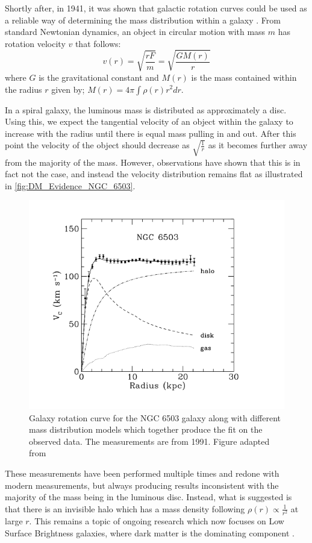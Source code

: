 \par
Shortly after, in 1941, it was shown that galactic rotation curves could be used as a reliable way of determining the mass distribution within a galaxy \cite{Chandrasekhar_1941_ref}.
From standard Newtonian dynamics, an object in circular motion with mass $m$ has rotation velocity $v$ that follows:
\begin{equation}
    v(r) = \sqrt{\frac{rF}{m}} = \sqrt{\frac{GM(r)}{r}}
    \label{eq:Kepler_Motion}
\end{equation}
where $G$ is the gravitational constant and $M(r)$ is the mass contained within the radius $r$ given by; $M(r) = 4 \pi \int \rho(r) r^{2} dr$.
\par
In a spiral galaxy, the luminous mass is distributed as approximately a disc. 
Using this, we expect the tangential velocity of an object within the galaxy to increase with the radius until there is equal mass pulling in and out.
After this point the velocity of the object should decrease as $\sqrt{\frac{1}{r}}$ as it becomes further away from the majority of the mass.
However, observations have shown that this is in fact not the case, and instead the velocity distribution remains flat as illustrated in \autoref{fig:DM_Evidence_NGC_6503}.
\begin{figure}[]%
    \centering
    \includegraphics[scale=1.0]{Figures/DarkMatterEvidence/NGC_6503_galaxy_speed.png}
    \caption[Galaxy rotation curve for the NGC 6503 galaxy]{Galaxy rotation curve for the NGC 6503 galaxy along with different mass distribution models which together produce the fit on the observed data. The measurements are from 1991. Figure adapted from \cite{NGC_6503_galaxy_rotation_ref}}
    \label{fig:DM_Evidence_NGC_6503}
\end{figure}
These measurements have been performed multiple times and redone with modern measurements, but always producing results inconsistent with the majority of the mass being in the luminous disc.
Instead, what is suggested is that there is an invisible halo which has a mass density following $\rho(r) \propto \frac{1}{r^2}$ at large $r$.
This remains a topic of ongoing research which now focuses on Low Surface Brightness galaxies, where dark matter is the dominating component \cite{MHONGOOSE_2018_ref}.


